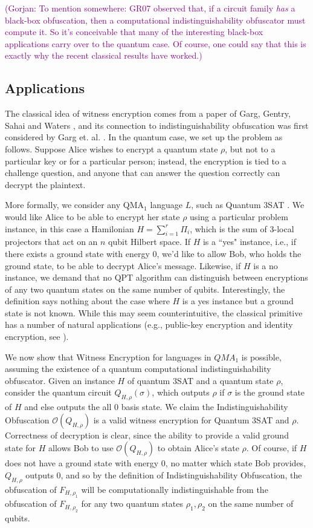 \documentclass[11pt]{article}
\numberwithin{equation}{section}
\newcommand{\algo}{\mathcal}
\newcommand{\ga}[1]{{ \textcolor{purple}{(Gorjan:  #1)}}{}}
\begin{document}
{\ga{To mention somewhere: GR07 observed that, if a circuit family \emph{has} a black-box obfuscation, then a computational indistinguishability obfuscator must compute it. So it's conceivable that many of the interesting black-box applications carry over to the quantum case. Of course, one could say that this is exactly why the recent classical results have worked.}


\subsection{Applications}

 The classical idea of witness encryption comes from a paper of Garg, Gentry, Sahai and Waters \cite{GGSW13}, and its connection to indistinguishability obfuscation was first considered by Garg et. al. \cite{GGHRSW13}. In the quantum case, we set up the problem as follows. Suppose Alice wishes to encrypt a quantum state $\rho$, but not to a particular key or for a particular person; instead, the encryption is tied to a challenge question, and anyone that can answer the question correctly can decrypt the plaintext. 

More formally, we consider any QMA$_{1}$ language $L$, such as Quantum $3$SAT \cite{GN13}.  We would like Alice to be able to encrypt her state $\rho$ using a particular problem instance, in this case a Hamilonian $H=\sum_{i=1}^r \Pi_{i}$, which is the sum of 3-local projectors that act on an $n$ qubit Hilbert space.  If $H$ is a ``yes" instance, i.e., if there exists a ground state with energy 0, we'd like to allow Bob, who holds the ground state, to be able to decrypt Alice's message.  Likewise, if $H$ is a no instance, we demand that no QPT algorithm can distinguish between encryptions of any two quantum states  on the same number of qubits.  Interestingly, the definition says nothing about the case where $H$ is a yes instance but a ground state is not known. While this may seem counterintuitive, the classical primitive has a number of natural applications (e.g., public-key encryption and identity encryption, see \cite{GGSW13}). 

We now show that Witness Encryption for languages in $QMA_1$ is possible, assuming the existence of a quantum computational indistinguishability obfuscator.  Given an instance $H$ of quantum $3$SAT and a quantum state $\rho$, consider the quantum circuit $Q_{H,\rho}(\sigma)$, which outputs $\rho$ if $\sigma$ is the ground state of $H$ and else outputs the all $0$ basis state.  We claim the Indistinguishability Obfuscation $\algo{O}(Q_{H,\rho})$ is a valid witness encryption for Quantum $3$SAT and $\rho$.  Correctness of decryption is clear, since the ability to provide a valid ground state for $H$ allows Bob to use $\algo{O}(Q_{H,\rho})$ to obtain Alice's state $\rho$.  Of course, if $H$ does not have a ground state with energy $0$, no matter which state Bob provides, $Q_{H,\rho}$ outputs 0, and so by the definition of Indistinguishability Obfuscation, the obfuscation of $F_{H,\rho_1}$ will be computationally indistinguishable from the obfuscation of $F_{H,\rho_2}$ for any two quantum states $\rho_1,\rho_2$ on the same number of qubits.

}
\end{document}
